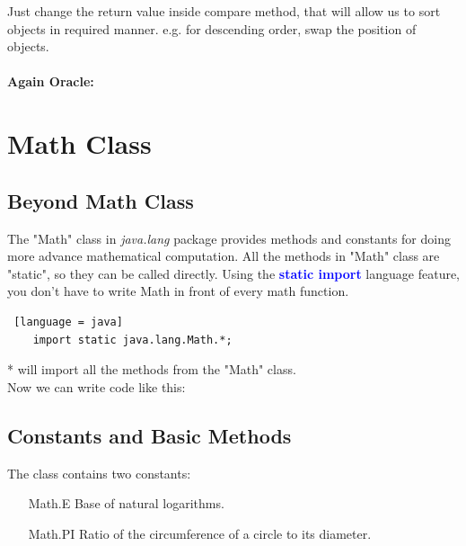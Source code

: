 \documentclass[10 pt]{book}
\begin{document}
Just change the return value inside compare method, that will allow us to sort objects in required manner. e.g. for descending order, swap the position of objects.

\paragraph{Again Oracle:}
\section{Math Class}
\subsection{Beyond Math Class}
The "Math" class in \textit{java.lang} package provides methods and constants for doing more advance mathematical computation. All the methods in "Math" class are "static", so they can be called directly. Using the \textbf{\textcolor{blue}{static import}} language feature, you don't have to write Math in front of every math function.
\begin{lstlisting} [language = java]
	import static java.lang.Math.*;
\end{lstlisting}

* will import all the methods from the "Math" class.\\
Now we can write code like this:
\subsection{Constants and Basic Methods}
The class contains two constants:
	\begin{enumerate}
		\item[Math.E] Base of natural logarithms.
		\item[Math.PI] Ratio of the circumference of a circle to its diameter.
	\end{enumerate}
	
\end{document}
